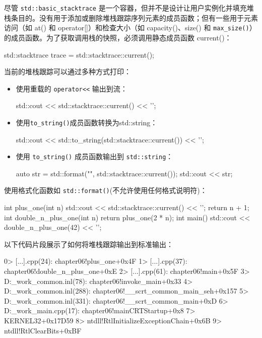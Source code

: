 尽管 \verb|std::basic_stacktrace| 是一个容器，但并不是设计让用户实例化并填充堆栈条目的。没有用于添加或删除堆栈跟踪序列元素的成员函数；但有一些用于元素访问（如 at() 和 operator[]）和检查大小（如 capacity()、size() 和 \verb|max_size()|）的成员函数。为了获取调用栈的快照，必须调用静态成员函数 current()：

\begin{cpp}
std::stacktrace trace = std::stacktrace::current();
\end{cpp}

当前的堆栈跟踪可以通过多种方式打印：

\begin{itemize}
\item
使用重载的 \verb|operator<<| 输出到流：

\begin{cpp}
std::cout << std::stacktrace::current() << '\n';
\end{cpp}

\item
使用\verb|to_string()|成员函数转换为std::string：

\begin{cpp}
std::cout << std::to_string(std::stacktrace::current())
          << '\n';
\end{cpp}

\item
使用 \verb|to_string()| 成员函数输出到 \verb|std::string|：

\begin{cpp}
auto str = std::format("{}\n", std::stacktrace::current());
std::cout << str;
\end{cpp}
\end{itemize}

使用格式化函数如 \verb|std::format()|(不允许使用任何格式说明符)：

\begin{cpp}
int plus_one(int n)
{
    std::cout << std::stacktrace::current() << '\n';
    return n + 1;
}
int double_n_plus_one(int n)
{
    return plus_one(2 * n);
}
int main()
{
    std::cout << double_n_plus_one(42) << '\n';
}
\end{cpp}

以下代码片段展示了如何将堆栈跟踪输出到标准输出：

\begin{shell}
0> [...]\main.cpp(24): chapter06!plus_one+0x4F
1> [...]\main.cpp(37): chapter06!double_n_plus_one+0xE
2> [...]\main.cpp(61): chapter06!main+0x5F
3> D:\a\_work\1\s\src\vctools\crt\vcstartup\src\startup\exe_common.inl(78): chapter06!invoke_main+0x33
4> D:\a\_work\1\s\src\vctools\crt\vcstartup\src\startup\exe_common.inl(288): chapter06!__scrt_common_main_seh+0x157
5> D:\a\_work\1\s\src\vctools\crt\vcstartup\src\startup\exe_common.inl(331): chapter06!__scrt_common_main+0xD
6> D:\a\_work\1\s\src\vctools\crt\vcstartup\src\startup\exe_main.cpp(17): chapter06!mainCRTStartup+0x8
7> KERNEL32+0x17D59
8> ntdll!RtlInitializeExceptionChain+0x6B
9> ntdll!RtlClearBits+0xBF
\end{shell}

